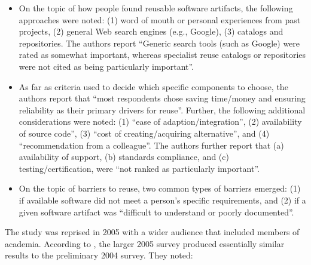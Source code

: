 \documentclass[review]{elsarticle}
\begin{document}
\begin{itemize}

\item On the topic of how people found reusable software artifacts, the following approaches were noted: (1) word of mouth or personal experiences from past projects, (2) general Web search engines (e.g., Google), (3) catalogs and repositories.  The authors report ``Generic search tools (such as Google) were rated as somewhat important, whereas specialist reuse catalogs or repositories were not cited as being particularly important''.

\item As far as criteria used to decide which specific components to choose, the authors report that ``most respondents chose saving time/money and ensuring reliability as their primary drivers for reuse''.  Further, the following additional considerations were noted: (1) ``ease of adaption/integration'', (2) availability of source code'', (3) ``cost of creating/acquiring alternative'', and (4) ``recommendation from a colleague''.  The authors further report that (a) availability of support, (b) standards compliance, and (c) testing/certification, were ``not ranked as particularly important''.

\item On the topic of barriers to reuse, two common types of barriers emerged: (1) if available software did not meet a person's specific requirements, and (2) if a given software artifact was ``difficult to understand or poorly documented''.

\end{itemize}

The study was reprised in 2005 with a wider audience that included members of academia.  According to \citet{marshall2006software}, the larger 2005 survey produced essentially similar results to the preliminary 2004 survey.  They noted:
\end{document}
